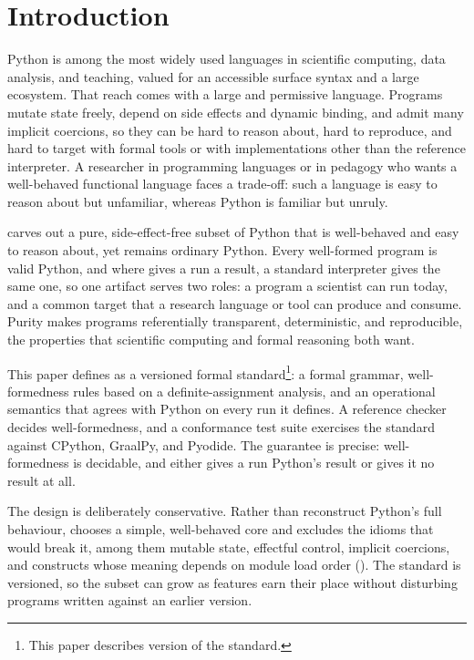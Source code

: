 \section{Introduction}

Python is among the most widely used languages in scientific computing, data analysis, and teaching, valued for
an accessible surface syntax and a large ecosystem. That reach comes with a large and permissive language.
Programs mutate state freely, depend on side effects and dynamic binding, and admit many implicit coercions, so
they can be hard to reason about, hard to reproduce, and hard to target with formal tools or with
implementations other than the reference interpreter. A researcher in programming languages or in pedagogy who
wants a well-behaved functional language faces a trade-off: such a language is easy to reason about but
unfamiliar, whereas Python is familiar but unruly.

\PurePy carves out a pure, side-effect-free subset of Python that is well-behaved and easy to reason about, yet
remains ordinary Python. Every well-formed \PurePy program is valid Python, and where \PurePy gives a run a
result, a standard interpreter gives the same one, so one artifact serves two roles: a program a scientist can run today, and a
common target that a research language or tool can produce and consume. Purity makes programs referentially
transparent, deterministic, and reproducible, the properties that scientific computing and formal reasoning
both want.

This paper defines \PurePy as a versioned formal standard\footnote{This paper describes version
\versionstring{} of the standard.}: a formal grammar, well-formedness rules based on a
definite-assignment analysis, and an operational semantics that agrees with Python on every run it defines. A reference checker decides well-formedness, and a conformance test suite exercises the
standard against CPython,  GraalPy, and Pyodide. The guarantee is precise: well-formedness is decidable, and
\PurePy either gives a run Python's result or gives it no result at all.

The design is deliberately conservative. Rather than reconstruct Python's full behaviour, \PurePy chooses a
simple, well-behaved core and excludes the idioms that would break it, among them mutable state, effectful
control, implicit coercions, and constructs whose meaning depends on module load order
(). The standard is versioned, so the subset can grow as features earn their place
without disturbing programs written against an earlier version.

